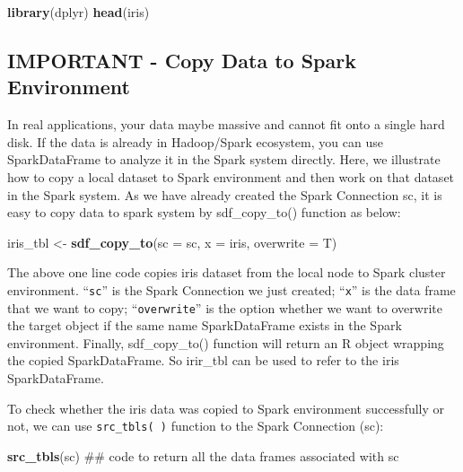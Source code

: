 \documentclass[]{book}
\newenvironment{Shaded}{\begin{snugshade}}{\end{snugshade}}
\newcommand{\KeywordTok}[1]{\textcolor[rgb]{0.13,0.29,0.53}{\textbf{{#1}}}}
\newcommand{\DataTypeTok}[1]{\textcolor[rgb]{0.13,0.29,0.53}{{#1}}}
\newcommand{\StringTok}[1]{\textcolor[rgb]{0.31,0.60,0.02}{{#1}}}
\newcommand{\NormalTok}[1]{{#1}}
\theoremstyle{definition}
\theoremstyle{definition}
\theoremstyle{remark}
\begin{document}
\begin{Shaded}
\begin{Highlighting}[]
\KeywordTok{library}\NormalTok{(dplyr)}
\KeywordTok{head}\NormalTok{(iris)}
\end{Highlighting}
\end{Shaded}

\subsection{IMPORTANT - Copy Data to Spark
Environment}\label{important---copy-data-to-spark-environment}

In real applications, your data maybe massive and cannot fit onto a
single hard disk. If the data is already in Hadoop/Spark ecosystem, you
can use SparkDataFrame to analyze it in the Spark system directly. Here,
we illustrate how to copy a local dataset to Spark environment and then
work on that dataset in the Spark system. As we have already created the
Spark Connection sc, it is easy to copy data to spark system by
sdf\_copy\_to() function as below:

\begin{Shaded}
\begin{Highlighting}[]
\NormalTok{iris_tbl <-}\StringTok{ }\KeywordTok{sdf_copy_to}\NormalTok{(}\DataTypeTok{sc =} \NormalTok{sc, }\DataTypeTok{x =} \NormalTok{iris, }\DataTypeTok{overwrite =} \NormalTok{T)}
\end{Highlighting}
\end{Shaded}

The above one line code copies iris dataset from the local node to Spark
cluster environment. ``\texttt{sc}'' is the Spark Connection we just
created; ``\texttt{x}'' is the data frame that we want to copy;
``\texttt{overwrite}'' is the option whether we want to overwrite the
target object if the same name SparkDataFrame exists in the Spark
environment. Finally, sdf\_copy\_to() function will return an R object
wrapping the copied SparkDataFrame. So irir\_tbl can be used to refer to
the iris SparkDataFrame.

To check whether the iris data was copied to Spark environment
successfully or not, we can use \texttt{src\_tbls(\ )} function to the
Spark Connection (sc):

\begin{Shaded}
\begin{Highlighting}[]
\KeywordTok{src_tbls}\NormalTok{(sc) ## code to return all the data frames associated with sc}
\end{Highlighting}
\end{Shaded}
\end{document}
